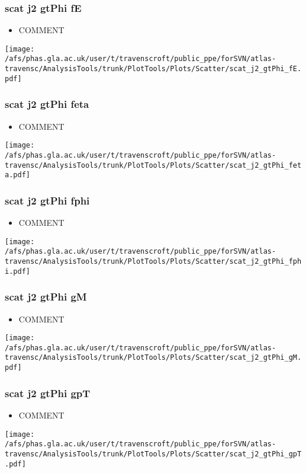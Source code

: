 \documentclass{beamer}
\begin{document}
\begin{frame}
\frametitle{scat j2 gtPhi fE}
\begin{itemize}
\item COMMENT
\end{itemize}
\begin{center}
\texttt{[image: /afs/phas.gla.ac.uk/user/t/travenscroft/public\_ppe/forSVN/atlas-travensc/AnalysisTools/trunk/PlotTools/Plots/Scatter/scat\_j2\_gtPhi\_fE.pdf]}
\end{center}
\end{frame}

\begin{frame}
\frametitle{scat j2 gtPhi feta}
\begin{itemize}
\item COMMENT
\end{itemize}
\begin{center}
\texttt{[image: /afs/phas.gla.ac.uk/user/t/travenscroft/public\_ppe/forSVN/atlas-travensc/AnalysisTools/trunk/PlotTools/Plots/Scatter/scat\_j2\_gtPhi\_feta.pdf]}
\end{center}
\end{frame}

\begin{frame}
\frametitle{scat j2 gtPhi fphi}
\begin{itemize}
\item COMMENT
\end{itemize}
\begin{center}
\texttt{[image: /afs/phas.gla.ac.uk/user/t/travenscroft/public\_ppe/forSVN/atlas-travensc/AnalysisTools/trunk/PlotTools/Plots/Scatter/scat\_j2\_gtPhi\_fphi.pdf]}
\end{center}
\end{frame}

\begin{frame}
\frametitle{scat j2 gtPhi gM}
\begin{itemize}
\item COMMENT
\end{itemize}
\begin{center}
\texttt{[image: /afs/phas.gla.ac.uk/user/t/travenscroft/public\_ppe/forSVN/atlas-travensc/AnalysisTools/trunk/PlotTools/Plots/Scatter/scat\_j2\_gtPhi\_gM.pdf]}
\end{center}
\end{frame}

\begin{frame}
\frametitle{scat j2 gtPhi gpT}
\begin{itemize}
\item COMMENT
\end{itemize}
\begin{center}
\texttt{[image: /afs/phas.gla.ac.uk/user/t/travenscroft/public\_ppe/forSVN/atlas-travensc/AnalysisTools/trunk/PlotTools/Plots/Scatter/scat\_j2\_gtPhi\_gpT.pdf]}
\end{center}
\end{frame}
\end{document}
